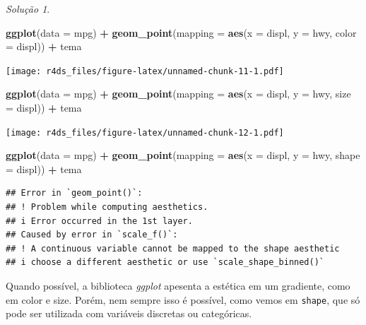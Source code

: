 \documentclass[
]{latex/krantz}
\newenvironment{Shaded}{\begin{snugshade}}{\end{snugshade}}
\newcommand{\AttributeTok}[1]{\textcolor[rgb]{0.13,0.29,0.53}{#1}}
\newcommand{\FunctionTok}[1]{\textcolor[rgb]{0.13,0.29,0.53}{\textbf{#1}}}
\newcommand{\NormalTok}[1]{#1}
\newcommand{\SpecialCharTok}[1]{\textcolor[rgb]{0.81,0.36,0.00}{\textbf{#1}}}
\theoremstyle{definition}
\theoremstyle{definition}
\theoremstyle{definition}
\theoremstyle{definition}
\theoremstyle{remark}
\newtheorem*{solution}{Solução}
\begin{document}
\begin{solution}
\leavevmode

\begin{Shaded}
\begin{Highlighting}[]
\FunctionTok{ggplot}\NormalTok{(}\AttributeTok{data =}\NormalTok{ mpg) }\SpecialCharTok{+}
    \FunctionTok{geom\_point}\NormalTok{(}\AttributeTok{mapping =} \FunctionTok{aes}\NormalTok{(}\AttributeTok{x =}\NormalTok{ displ, }\AttributeTok{y =}\NormalTok{ hwy, }\AttributeTok{color =}\NormalTok{ displ)) }\SpecialCharTok{+}
\NormalTok{    tema}
\end{Highlighting}
\end{Shaded}

\texttt{[image: r4ds\_files/figure-latex/unnamed-chunk-11-1.pdf]}

\begin{Shaded}
\begin{Highlighting}[]
\FunctionTok{ggplot}\NormalTok{(}\AttributeTok{data =}\NormalTok{ mpg) }\SpecialCharTok{+}
    \FunctionTok{geom\_point}\NormalTok{(}\AttributeTok{mapping =} \FunctionTok{aes}\NormalTok{(}\AttributeTok{x =}\NormalTok{ displ, }\AttributeTok{y =}\NormalTok{ hwy, }\AttributeTok{size =}\NormalTok{ displ)) }\SpecialCharTok{+}
\NormalTok{    tema}
\end{Highlighting}
\end{Shaded}

\texttt{[image: r4ds\_files/figure-latex/unnamed-chunk-12-1.pdf]}

\begin{Shaded}
\begin{Highlighting}[]
\FunctionTok{ggplot}\NormalTok{(}\AttributeTok{data =}\NormalTok{ mpg) }\SpecialCharTok{+}
    \FunctionTok{geom\_point}\NormalTok{(}\AttributeTok{mapping =} \FunctionTok{aes}\NormalTok{(}\AttributeTok{x =}\NormalTok{ displ, }\AttributeTok{y =}\NormalTok{ hwy, }\AttributeTok{shape =}\NormalTok{ displ)) }\SpecialCharTok{+}
\NormalTok{    tema}
\end{Highlighting}
\end{Shaded}

\begin{verbatim}
## Error in `geom_point()`:
## ! Problem while computing aesthetics.
## i Error occurred in the 1st layer.
## Caused by error in `scale_f()`:
## ! A continuous variable cannot be mapped to the shape aesthetic
## i choose a different aesthetic or use `scale_shape_binned()`
\end{verbatim}

Quando possível, a biblioteca \emph{ggplot} apesenta a estética em um gradiente, como em color e size. Porém, nem sempre isso é possível, como vemos em \texttt{shape}, que só pode ser utilizada com variáveis discretas ou categóricas.

\end{solution}
\end{document}
